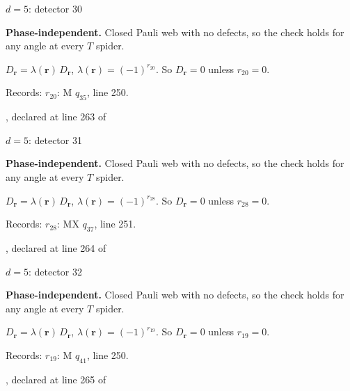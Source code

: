 \label{d5_det030}
{\Large $d=5$: detector 30}\par
\textbf{Phase-independent.} Closed Pauli web with no defects, so the check holds for any angle at every $T$ spider.
\begin{center}
\end{center}
\vspace{-1mm}
$D_{\boldsymbol r}=\lambda(\boldsymbol r)\,D_{\boldsymbol r}$, \quad $\lambda(\boldsymbol r)=(-1)^{r_{20}}$. \qquad So $D_{\boldsymbol r}=0$ unless $r_{20}=0$.
\par\smallskip\begin{minipage}{.98\linewidth}\small Records: $r_{20}$: M $q_{35}$, line 250.\end{minipage}
\vfill
{\footnotesize\texttt{}, declared at line 263 of \texttt{}}
\newpage

\label{d5_det031}
{\Large $d=5$: detector 31}\par
\textbf{Phase-independent.} Closed Pauli web with no defects, so the check holds for any angle at every $T$ spider.
\begin{center}
\end{center}
\vspace{-1mm}
$D_{\boldsymbol r}=\lambda(\boldsymbol r)\,D_{\boldsymbol r}$, \quad $\lambda(\boldsymbol r)=(-1)^{r_{28}}$. \qquad So $D_{\boldsymbol r}=0$ unless $r_{28}=0$.
\par\smallskip\begin{minipage}{.98\linewidth}\small Records: $r_{28}$: MX $q_{37}$, line 251.\end{minipage}
\vfill
{\footnotesize\texttt{}, declared at line 264 of \texttt{}}
\newpage

\label{d5_det032}
{\Large $d=5$: detector 32}\par
\textbf{Phase-independent.} Closed Pauli web with no defects, so the check holds for any angle at every $T$ spider.
\begin{center}
\end{center}
\vspace{-1mm}
$D_{\boldsymbol r}=\lambda(\boldsymbol r)\,D_{\boldsymbol r}$, \quad $\lambda(\boldsymbol r)=(-1)^{r_{19}}$. \qquad So $D_{\boldsymbol r}=0$ unless $r_{19}=0$.
\par\smallskip\begin{minipage}{.98\linewidth}\small Records: $r_{19}$: M $q_{41}$, line 250.\end{minipage}
\vfill
{\footnotesize\texttt{}, declared at line 265 of \texttt{}}
\newpage

